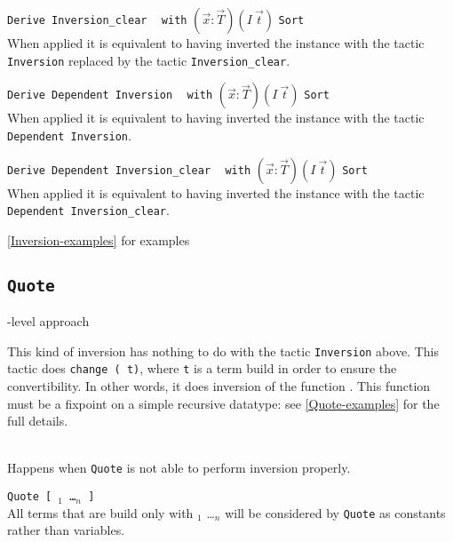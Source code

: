 \begin{Variants}
\item \texttt{Derive Inversion\_clear} \ident~ \texttt{with}
  $(\vec{x}:\vec{T})(I~\vec{t})$ \texttt{Sort} \sort~ \\ 
  When applied it is equivalent to having
  inverted the instance with the tactic \texttt{Inversion}
  replaced by the tactic \texttt{Inversion\_clear}.
\item \texttt{Derive Dependent Inversion} \ident~ \texttt{with}
  $(\vec{x}:\vec{T})(I~\vec{t})$ \texttt{Sort} \sort~\\
  When applied it is equivalent to having
  inverted the instance with the tactic \texttt{Dependent Inversion}.
\item \texttt{Derive Dependent Inversion\_clear} \ident~ \texttt{with}
  $(\vec{x}:\vec{T})(I~\vec{t})$ \texttt{Sort} \sort~\\
  When applied it is equivalent to having
  inverted the instance with the tactic \texttt{Dependent Inversion\_clear}.
\end{Variants}

\SeeAlso \ref{Inversion-examples} for examples

\subsection{\texttt{Quote} \ident}
-level approach

This kind of inversion has nothing to do with the tactic
\texttt{Inversion} above. This tactic does \texttt{change (\ident\
  t)}, where \texttt{t} is a term build in order to ensure the
convertibility. In other words, it does inversion of the function
\ident. This function must be a fixpoint on a simple recursive
datatype: see \ref{Quote-examples} for the full details.

\begin{ErrMsgs}
\item {}\\
  Happens when \texttt{Quote} is not able to perform inversion properly.
\end{ErrMsgs}

\begin{Variants}
\item \texttt{Quote {\ident} [ \ident$_1$ \dots \ident$_n$ ]}\\
  All terms that are build only with \ident$_1$ \dots \ident$_n$ will be
  considered by \texttt{Quote} as constants rather than variables.
\end{Variants}

